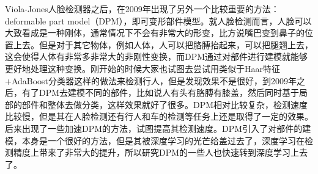 Viola-Jones人脸检测器之后，在2009年出现了另外一个比较重要的方法：deformable
part model（DPM），即可变形部件模型。就人脸检测而言，人脸可以大致看成是一种刚体，通常情况下不会有非常大的形变，比方说嘴巴变到鼻子的位置上去。但是对于其它物体，例如人体，人可以把胳膊抬起来，可以把腿翘上去，这会使得人体有非常多非常大的非刚性变换，而DPM通过对部件进行建模就能够更好地处理这种变换。刚开始的时候大家也试图去尝试用类似于Haar特征+AdaBoost分类器这样的做法来检测行人，但是发现效果不是很好，到2009年之后，有了DPM去建模不同的部件，比如说人有头有胳膊有膝盖，然后同时基于局部的部件和整体去做分类，这样效果就好了很多。DPM相对比较复杂，检测速度比较慢，但是其在人脸检测还有行人和车的检测等任务上还是取得了一定的效果。后来出现了一些加速DPM的方法，试图提高其检测速度。DPM引入了对部件的建模，本身是一个很好的方法，但是其被深度学习的光芒给盖过去了，深度学习在检测精度上带来了非常大的提升，所以研究DPM的一些人也快速转到深度学习上去了。